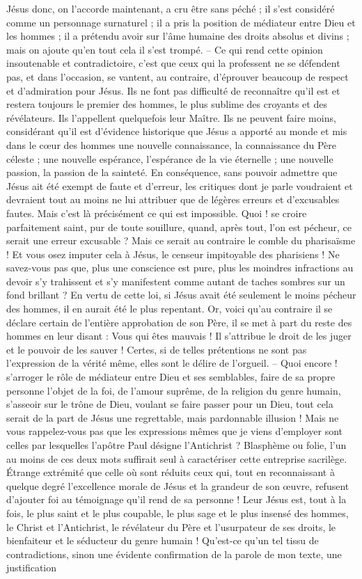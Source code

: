 Jésus donc, on l’accorde maintenant, a cru être sans péché ; il s’est considéré comme un personnage surnaturel ; il a pris la position de médiateur entre Dieu et les hommes ; il a prétendu avoir sur l’âme humaine des droits absolus et divins ; mais on ajoute qu’en tout cela il s’est trompé. – Ce qui rend cette opinion insoutenable et contradictoire, c’est que ceux qui la professent ne se défendent pas, et dans l’occasion, se vantent, au contraire, d’éprouver beaucoup de respect et d’admiration pour Jésus. Ils ne font pas difficulté de reconnaître qu’il est et restera toujours le premier des hommes, le plus sublime des croyants et des révélateurs. Ils l’appellent quelquefois leur Maître. Ils ne peuvent faire moins, considérant qu’il est d’évidence historique que Jésus a apporté au monde et mis dans le cœur des hommes une nouvelle connaissance, la connaissance du Père céleste ; une nouvelle espérance, l’espérance de la vie éternelle ; une nouvelle passion, la passion de la sainteté. En conséquence, sans pouvoir admettre que Jésus ait été exempt de faute et d’erreur, les critiques dont je parle voudraient et devraient tout au moins ne lui attribuer que de légères erreurs et d’excusables fautes. Mais c’est là précisément ce qui est impossible. Quoi ! se croire parfaitement saint, pur de toute souillure, quand, après tout, l’on est pécheur, ce serait une erreur excusable ? Mais ce serait au contraire le comble du pharisaïsme ! Et vous osez imputer cela à Jésus, le censeur impitoyable des pharisiens ! Ne savez-vous pas que, plus une conscience est pure, plus les moindres infractions au devoir s’y trahissent et s’y manifestent comme autant de taches sombres sur un fond brillant ? En vertu de cette loi, si Jésus avait été seulement le moins pécheur des hommes, il en aurait été le plus repentant. Or, voici qu’au contraire il se déclare certain de l’entière approbation de son Père, il se met à part du reste des hommes en leur disant : \Og{} Vous qui êtes mauvais !\Fg{} Il s’attribue le droit de les juger et le pouvoir de les sauver ! Certes, si de telles prétentions ne sont pas l’expression de la vérité même, elles sont le délire de l’orgueil. – Quoi encore ! s’arroger le rôle de médiateur entre Dieu et ses semblables, faire de sa propre personne l’objet de la foi, de l’amour suprême, de la religion du genre humain, s’asseoir sur le trône de Dieu, voulant se faire passer pour un Dieu, tout cela serait de la part de Jésus une regrettable, mais pardonnable illusion ! Mais ne vous rappelez-vous pas que les expressions mêmes que je viens d’employer sont celles par lesquelles l’apôtre Paul désigne l’Antichrist ? Blasphème ou folie, l’un au moins de ces deux mots suffirait seul à caractériser cette entreprise sacrilège. Étrange extrémité que celle où sont réduits ceux qui, tout en reconnaissant à quelque degré l’excellence morale de Jésus et la grandeur de son œuvre, refusent d’ajouter foi au témoignage qu’il rend de sa personne ! Leur Jésus est, tout à la fois, le plus saint et le plus coupable, le plus sage et le plus insensé des hommes, le Christ et l’Antichrist, le révélateur du Père et l’usurpateur de ses droits, le bienfaiteur et le séducteur du genre humain ! Qu’est-ce qu’un tel tissu de contradictions, sinon une évidente confirmation de la parole de mon texte, une justification 